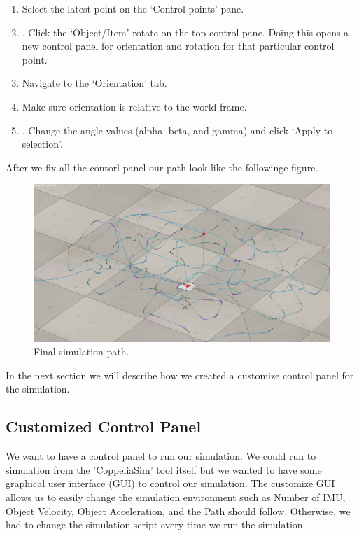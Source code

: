 \begin{enumerate}
 \item	Select the latest point on the ‘Control points’ pane.
 \item.	Click the ‘Object/Item’ rotate on the top control pane. Doing this opens a new control panel for orientation and rotation for that particular control point.
 \item	Navigate to the ‘Orientation’ tab.
 \item	Make sure orientation is relative to the world frame.
 \item.	Change the angle values (alpha, beta, and gamma) and click ‘Apply to selection’.
\end{enumerate}

After we fix all the contorl panel our path look like the followinge figure.

\begin{figure}[h]
  \centering
    \includegraphics[width=0.9\linewidth]{figures/finalPath.png}
    \caption{Final simulation path.}
\label{fig:finalPath}
\end{figure}

In the next section we will describe how we created a customize control panel for the simulation.


\subsection{Customized Control Panel}

We want to have a control panel to run our simulation. We could run to simulation from the 'CoppeliaSim' tool itself but we wanted to have some graphical user interface (GUI) to control our simulation. The customize GUI allows us to easily change the simulation environment such as Number of IMU, Object Velocity, Object Acceleration, and the Path should follow. Otherwise, we had to change the simulation script every time we run the simulation.

